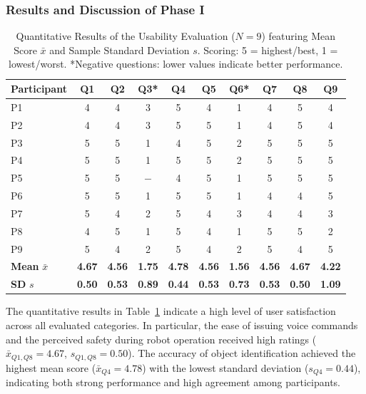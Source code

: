 \documentclass[lettersize,journal]{IEEEtran}
\begin{document}
\subsubsection{Results and Discussion of Phase I}
\begin{table}[!b]
	\centering
	\caption{Quantitative Results of the Usability Evaluation ($N=9$) featuring Mean Score $\bar{x}$ and Sample Standard Deviation $s$. Scoring: 5 = highest/best, 1 = lowest/worst.
		*Negative questions: lower values indicate better performance.}
	\label{tab:user_study_results}
	\setlength{\tabcolsep}{3.5pt} 
	\begin{tabular}{|l|c|c|c|c|c|c|c|c|c|}
		\hline
		\textbf{Participant} & \textbf{Q1} & \textbf{Q2} & \textbf{Q3*} & \textbf{Q4} & \textbf{Q5} & \textbf{Q6*} & \textbf{Q7} & \textbf{Q8} & \textbf{Q9} \\ \hline
		P1 & 4 & 4 & 3 & 5 & 4 & 1 & 4 & 5 & 4 \\ \hline
		P2 & 4 & 4 & 3 & 5 & 5 & 1 & 4 & 5 & 4 \\ \hline
		P3 & 5 & 5 & 1 & 4 & 5 & 2 & 5 & 5 & 5 \\ \hline
		P4 & 5 & 5 & 1 & 5 & 5 & 2 & 5 & 5 & 5 \\ \hline
		P5 & 5 & 5 & $-$ & 4 & 5 & 1 & 5 & 5 & 5 \\ \hline
		P6 & 5 & 5 & 1 & 5 & 5 & 1 & 4 & 4 & 5 \\ \hline
		P7 & 5 & 4 & 2 & 5 & 4 & 3 & 4 & 4 & 3 \\ \hline
		P8 & 4 & 5 & 1 & 5 & 4 & 1 & 5 & 5 & 2 \\ \hline
		P9 & 5 & 4 & 2 & 5 & 4 & 2 & 5 & 4 & 5 \\ \hline \hline
		\textbf{Mean} $\bar{x}$ & \textbf{4.67} & \textbf{4.56} & \textbf{1.75} & \textbf{4.78} & \textbf{4.56} & \textbf{1.56} & \textbf{4.56} & \textbf{4.67} & \textbf{4.22} \\ \hline
		\textbf{SD} $s$ & \textbf{0.50} & \textbf{0.53} & \textbf{0.89} & \textbf{0.44} & \textbf{0.53} & \textbf{0.73} & \textbf{0.53} & \textbf{0.50} & \textbf{1.09} \\ \hline
	\end{tabular}
	\vspace{1ex}
\end{table}

The quantitative results in Table~\ref{tab:user_study_results} indicate a high level of user satisfaction across all evaluated categories. In particular, the ease of issuing voice commands and the perceived safety during robot operation received high ratings ($\bar{x}_{Q1,Q8} = 4.67$, $s_{Q1,Q8} = 0.50$). The accuracy of object identification achieved the highest mean score ($\bar{x}_{Q4} = 4.78$) with the lowest standard deviation ($s_{Q4} = 0.44$), indicating both strong performance and high agreement among participants.
\end{document}
